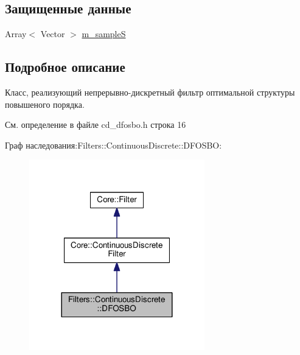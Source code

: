 \subsection*{Защищенные данные}
\begin{DoxyCompactItemize}
\item 
Array$<$ Vector $>$ \hyperlink{class_filters_1_1_continuous_discrete_1_1_d_f_o_s_b_o_affccb91872f23878db490d487c481606}{m\+\_\+sampleS}
\end{DoxyCompactItemize}


\subsection{Подробное описание}
Класс, реализующий непрерывно-\/дискретный фильтр оптимальной структуры повышеного порядка. 

См. определение в файле cd\+\_\+dfosbo.\+h строка 16



Граф наследования\+:Filters\+:\+:Continuous\+Discrete\+:\+:D\+F\+O\+S\+BO\+:
\nopagebreak
\begin{figure}[H]
\begin{center}
\leavevmode
\includegraphics[width=216pt]{class_filters_1_1_continuous_discrete_1_1_d_f_o_s_b_o__inherit__graph}
\end{center}
\end{figure}


